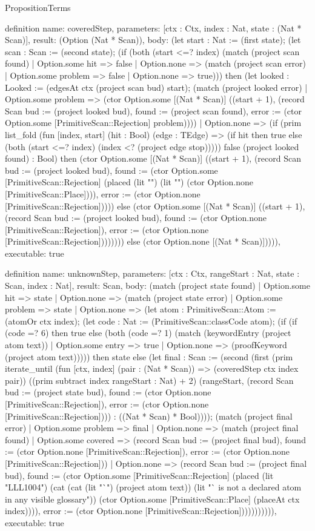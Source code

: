 \begin{lexlean}{PropositionTerms}
\begin{semanticmodule}
definition{
  name: coveredStep,
  parameters: [ctx : Ctx, index : Nat, state : (Nat * Scan)],
  result: (Option (Nat * Scan)),
  body: (let start : Nat := (first state); (let scan : Scan := (second state); (if (both (start <=? index) (match (project scan found)
    | Option.some hit => false
    | Option.none => (match (project scan error)
      | Option.some problem => false
      | Option.none => true))) then (let looked : Looked := (edgesAt ctx (project scan bud) start); (match (project looked error)
    | Option.some problem => (ctor Option.some [(Nat * Scan)] ((start + 1), (record Scan {bud := (project looked bud), found := (project scan found), error := (ctor Option.some [PrimitiveScan::Rejection] problem)})))
    | Option.none => (if (prim list_fold (fun [index, start] (hit : Bool) (edge : TEdge) => (if hit then true else (both (start <=? index) (index <? (project edge stop))))) false (project looked found) : Bool) then (ctor Option.some [(Nat * Scan)] ((start + 1), (record Scan {bud := (project looked bud), found := (ctor Option.some [PrimitiveScan::Rejection] (placed (lit "") (lit "") (ctor Option.none [PrimitiveScan::Place]))), error := (ctor Option.none [PrimitiveScan::Rejection])}))) else (ctor Option.some [(Nat * Scan)] ((start + 1), (record Scan {bud := (project looked bud), found := (ctor Option.none [PrimitiveScan::Rejection]), error := (ctor Option.none [PrimitiveScan::Rejection])})))))) else (ctor Option.none [(Nat * Scan)])))),
  executable: true
}

definition{
  name: unknownStep,
  parameters: [ctx : Ctx, rangeStart : Nat, state : Scan, index : Nat],
  result: Scan,
  body: (match (project state found)
    | Option.some hit => state
    | Option.none => (match (project state error)
      | Option.some problem => state
      | Option.none => (let atom : PrimitiveScan::Atom := (atomOr ctx index); (let code : Nat := (PrimitiveScan::classCode atom); (if (if (code =? 6) then true else (both (code =? 1) (match (keywordEntry (project atom text))
        | Option.some entry => true
        | Option.none => (proofKeyword (project atom text))))) then state else (let final : Scan := (second (first (prim iterate_until (fun [ctx, index] (pair : (Nat * Scan)) => (coveredStep ctx index pair)) ((prim subtract index rangeStart : Nat) + 2) (rangeStart, (record Scan {bud := (project state bud), found := (ctor Option.none [PrimitiveScan::Rejection]), error := (ctor Option.none [PrimitiveScan::Rejection])})) : ((Nat * Scan) * Bool)))); (match (project final error)
        | Option.some problem => final
        | Option.none => (match (project final found)
          | Option.some covered => (record Scan {bud := (project final bud), found := (ctor Option.none [PrimitiveScan::Rejection]), error := (ctor Option.none [PrimitiveScan::Rejection])})
          | Option.none => (record Scan {bud := (project final bud), found := (ctor Option.some [PrimitiveScan::Rejection] (placed (lit "LLL1004") (cat (cat (lit "`") (project atom text)) (lit "` is not a declared atom in any visible glossary")) (ctor Option.some [PrimitiveScan::Place] (placeAt ctx index)))), error := (ctor Option.none [PrimitiveScan::Rejection])}))))))))),
  executable: true
}


\end{semanticmodule}
\end{lexlean}
